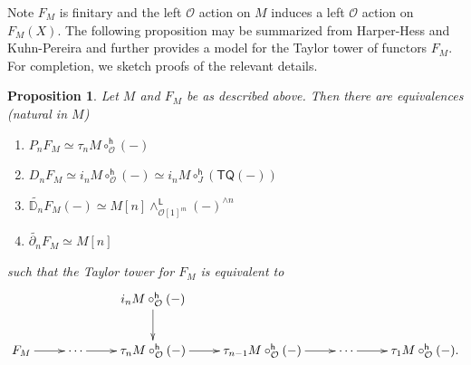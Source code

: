 \documentclass[11pt]{amsart}
\newtheorem{proposition}[subsection]{Proposition}
\theoremstyle{definition}
\theoremstyle{remark}
\newcommand{\TQ}{\mathsf{TQ}}
\newcommand{\Cal}[1]{\mathcal{#1}}
\begin{document}
Note $F_M$ is finitary and the left $\Cal{O}$ action on $M$ induces a left $\Cal{O}$ action on $F_M(X)$. The following proposition may be summarized from Harper-Hess \cite{Har-Hess} and Kuhn-Pereira \cite[]{KuhPer} and further provides a model for the Taylor tower of functors $F_M$. For completion, we sketch proofs of the relevant details. 

\begin{proposition} \label{prop:tay-tow-FM}
    Let $M$ and $F_M$ be as described above. Then there are equivalences (natural in $M$) \begin{enumerate}[label=(\roman*) ]
        \item $P_n F_M\simeq \tau_n M \circ^{\mathsf{h}}_{\Cal{O}} (-)$
        
        \item $D_n F_M\simeq i_n M\circ^{\mathsf{h}}_{\Cal{O}}(-) \simeq i_n M \circ^{\mathsf{h}}_J (\TQ(-))$ 
        
        \item $\widetilde{\mathbb{D}_n} F_M (-)\simeq M[n] \wedge^{\mathsf{L}}_{\Cal{O}[1]^{\wr n}} (-)^{\wedge n}$
        
        \item $\widetilde{\partial_n} F_M \simeq M[n]$
    \end{enumerate}
    such that the Taylor tower for $F_M$ is equivalent to \[\label{eq:taylor-tower-FM-AlgOO}
    \xymatrix{
    && i_n M \circ^{\mathsf{h}}_{\Cal{O}}(-) \ar[d] & & 
    \\
    F_M\ar[r] & 
    \cdots \ar[r] & 
    \tau_n M \circ^{\mathsf{h}}_{\Cal{O}} (-) \ar[r] & 
    \tau_{n-1} M\circ^{\mathsf{h}}_{\Cal{O}}(-) \ar[r] & \cdots \ar[r] & \tau_1M \circ^{\mathsf{h}}_{\Cal{O}}(-).
    }\]
\end{proposition}
\end{document}
